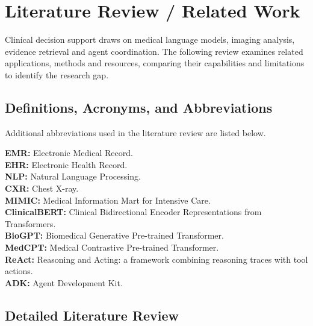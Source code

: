 \begingroup
\renewcommand{\encodingdefault}{T1}
\selectfont
\chapter{Literature Review / Related Work}

Clinical decision support draws on medical language models, imaging analysis, evidence retrieval and agent coordination. The following review examines related applications, methods and resources, comparing their capabilities and limitations to identify the research gap.

\section{Definitions, Acronyms, and Abbreviations}

Additional abbreviations used in the literature review are listed below.

\noindent\textbf{EMR:} Electronic Medical Record.\\
\noindent\textbf{EHR:} Electronic Health Record.\\
\noindent\textbf{NLP:} Natural Language Processing.\\
\noindent\textbf{CXR:} Chest X-ray.\\
\noindent\textbf{MIMIC:} Medical Information Mart for Intensive Care.\\
\noindent\textbf{ClinicalBERT:} Clinical Bidirectional Encoder Representations from Transformers.\\
\noindent\textbf{BioGPT:} Biomedical Generative Pre-trained Transformer.\\
\noindent\textbf{MedCPT:} Medical Contrastive Pre-trained Transformer.\\
\noindent\textbf{ReAct:} Reasoning and Acting: a framework combining reasoning traces with tool actions.\\
\noindent\textbf{ADK:} Agent Development Kit.


\section{Detailed Literature Review}

